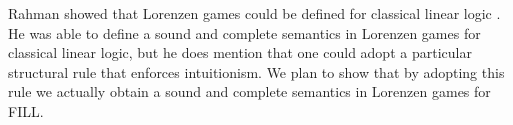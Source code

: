Rahman showed that Lorenzen games could be defined for classical
linear logic \cite{Rahman:2002}.  He was able to define a sound and
complete semantics in Lorenzen games for classical linear logic, but
he does mention that one could adopt a particular structural rule that
enforces intuitionism.  We plan to show that by adopting this rule we
actually obtain a sound and complete semantics in Lorenzen games for
FILL.







